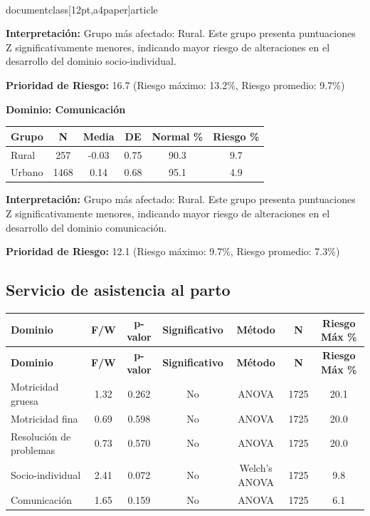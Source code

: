 \\documentclass[12pt,a4paper]{article}
\begin{document}
\textbf{Interpretación:} Grupo más afectado: Rural. Este grupo presenta puntuaciones Z significativamente menores, indicando mayor riesgo de alteraciones en el desarrollo del dominio socio-individual.

\textbf{Prioridad de Riesgo:} 16.7 (Riesgo máximo: 13.2\%, Riesgo promedio: 9.7\%)


\vspace{0.5cm}


\textbf{Dominio: Comunicación}


\begin{center}
\begin{tabular}{|l|c|c|c|c|c|}
\hline
\textbf{Grupo} & \textbf{N} & \textbf{Media} & \textbf{DE} & \textbf{Normal \%} & \textbf{Riesgo \%} \\
\hline
Rural & 257 & -0.03 & 0.75 & 90.3 & 9.7 \\
Urbano & 1468 & 0.14 & 0.68 & 95.1 & 4.9 \\

\hline
\end{tabular}
\end{center}


\textbf{Interpretación:} Grupo más afectado: Rural. Este grupo presenta puntuaciones Z significativamente menores, indicando mayor riesgo de alteraciones en el desarrollo del dominio comunicación.

\textbf{Prioridad de Riesgo:} 12.1 (Riesgo máximo: 9.7\%, Riesgo promedio: 7.3\%)


\vspace{0.5cm}


\subsection{Servicio de asistencia al parto}


\begin{longtable}{|l|c|c|c|c|c|c|}
\hline
\textbf{Dominio} & \textbf{F/W} & \textbf{p-valor} & \textbf{Significativo} & \textbf{Método} & \textbf{N} & \textbf{Riesgo Máx \%} \\
\hline
\endfirsthead

\hline
\textbf{Dominio} & \textbf{F/W} & \textbf{p-valor} & \textbf{Significativo} & \textbf{Método} & \textbf{N} & \textbf{Riesgo Máx \%} \\
\hline
\endhead

\hline
\endfoot

\hline
\endlastfoot

Motricidad gruesa & 1.32 & 0.262 & No & ANOVA & 1725 & 20.1 \\
Motricidad fina & 0.69 & 0.598 & No & ANOVA & 1725 & 20.0 \\
Resolución de problemas & 0.73 & 0.570 & No & ANOVA & 1725 & 20.0 \\
Socio-individual & 2.41 & 0.072 & No & Welch's ANOVA & 1725 & 9.8 \\
Comunicación & 1.65 & 0.159 & No & ANOVA & 1725 & 6.1 \\

\end{longtable}
\end{document}
